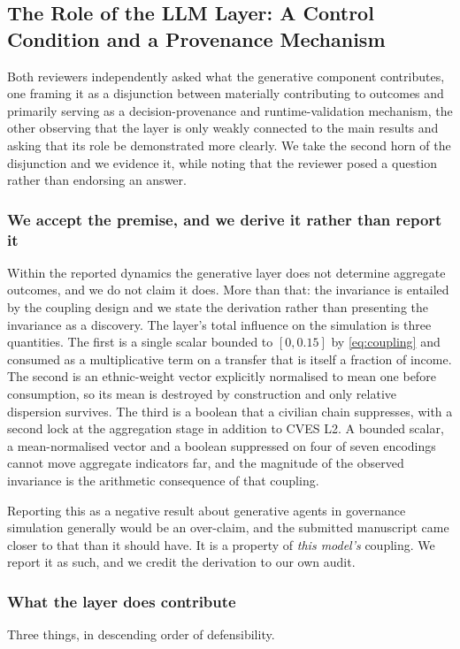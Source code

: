 \documentclass{ieeeaccess}
\begin{document}
\subsection{The Role of the LLM Layer: A Control Condition and a Provenance Mechanism}
\label{sec:llmrole}
Both reviewers independently asked what the generative component
contributes, one framing it as a disjunction between materially
contributing to outcomes and primarily serving as a decision-provenance
and runtime-validation mechanism, the other observing that the layer is
only weakly connected to the main results and asking that its role be
demonstrated more clearly. We take the second horn of the disjunction
and we evidence it, while noting that the reviewer posed a question
rather than endorsing an answer.

\subsubsection{We accept the premise, and we derive it rather than report it}
Within the reported dynamics the generative layer does not determine
aggregate outcomes, and we do not claim it does. More than that: the
invariance is entailed by the coupling design and we state the
derivation rather than presenting the invariance as a discovery. The
layer's total influence on the simulation is three quantities. The first
is a single scalar bounded to $[0, 0.15]$ by \eqref{eq:coupling} and
consumed as a multiplicative term on a transfer that is itself a
fraction of income. The second is an ethnic-weight vector explicitly
normalised to mean one before consumption, so its mean is destroyed by
construction and only relative dispersion survives. The third is a
boolean that a civilian chain suppresses, with a second lock at the
aggregation stage in addition to CVES L2. A bounded scalar, a
mean-normalised vector and a boolean suppressed on four of seven
encodings cannot move aggregate indicators far, and the magnitude of the
observed invariance is the arithmetic consequence of that coupling.

Reporting this as a negative result about generative agents in
governance simulation generally would be an over-claim, and the
submitted manuscript came closer to that than it should have. It is a
property of \emph{this model's} coupling. We report it as such, and we
credit the derivation to our own audit.

\subsubsection{What the layer does contribute}
Three things, in descending order of defensibility.
\end{document}

